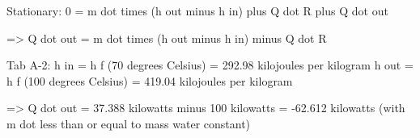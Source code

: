 Stationary:  
0 = m dot times (h out minus h in) plus Q dot R plus Q dot out  

=> Q dot out = m dot times (h out minus h in) minus Q dot R  

Tab A-2:  
h in = h f (70 degrees Celsius) = 292.98 kilojoules per kilogram  
h out = h f (100 degrees Celsius) = 419.04 kilojoules per kilogram  

=> Q dot out = 37.388 kilowatts minus 100 kilowatts = -62.612 kilowatts  
(with m dot less than or equal to mass water constant)